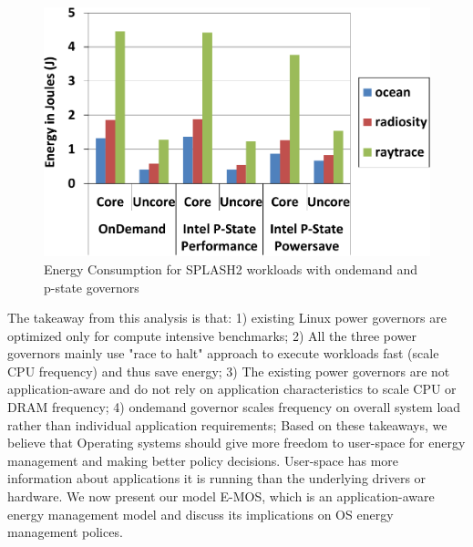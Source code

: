 \begin{figure}[h]
  \begin{center}
\includegraphics[width=\linewidth]{figs/def-drivers-splash-crop.pdf}
  \end{center}
  \vspace{-0.1in}
  \caption{Energy Consumption for SPLASH2 workloads with ondemand and p-state governors}
  \label{fig:splash-energy}
\end{figure}

\vspace{-0.1in}
The takeaway from this analysis is that: 1) existing Linux power governors 
are optimized only for compute intensive benchmarks;
2) All the three power governors mainly use "race to halt" approach to execute workloads 
fast (scale CPU frequency) and thus save energy;
3) The existing power governors are not application-aware and do not rely
on application characteristics to scale CPU or DRAM frequency;
4) ondemand governor scales frequency on overall system load
rather than individual application requirements;
Based on these takeaways, we believe that Operating systems
should give more freedom to user-space for energy management
and making better policy decisions. User-space has more 
information about applications it is running than
the underlying drivers or hardware.
We now present our model E-MOS, which is an application-aware
energy management model and discuss its implications on OS energy management polices.
